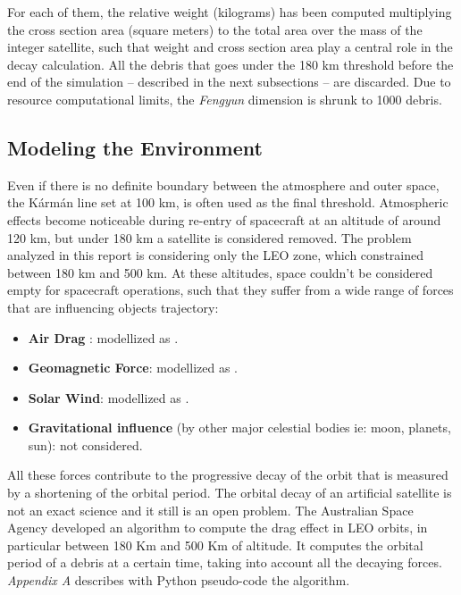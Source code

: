 \documentclass[a4paper,9pt,journal,twoside,compsoc]{PPIEEEtran}
\begin{document}
For each of them, the relative weight (kilograms) has been computed multiplying the cross section area (square meters) to the total area over the mass of the integer satellite, such that weight and cross section area play a central role in the decay calculation. All the debris that goes under the 180 km threshold before the end of the simulation -- described in the next subsections -- are discarded. Due to resource computational limits, the \textit{Fengyun} dimension is shrunk to 1000 debris. 

\subsection{Modeling the Environment}
Even if there is no definite boundary between the atmosphere and outer space, the Kármán line set at 100 km, is often used as the final threshold. Atmospheric effects become noticeable during re-entry of spacecraft at an altitude of around 120 km, but under 180 km a satellite is considered removed. The problem analyzed in this report is considering only the LEO zone, which constrained between 180 km and 500 km. At these altitudes, space couldn't be considered empty for spacecraft operations, such that they suffer from a wide range of forces that are influencing objects trajectory:

\begin{itemize}
\item \textbf{Air Drag} : modellized as \cite{australia}.
\item \textbf{Geomagnetic Force}: modellized as \cite{ap}.
\item \textbf{Solar Wind}: modellized as \cite{f10flux}.
\item \textbf{Gravitational influence} (by other major celestial bodies ie: moon, planets,     sun): not considered.
\end{itemize}

All these forces contribute to the progressive decay of the orbit that is measured by a shortening of the orbital period.
The orbital decay of an artificial satellite is not an exact science and it still is an open problem.
The Australian Space Agency developed an algorithm \cite{australia} to compute the drag effect in LEO orbits, in particular between 180 Km and 500 Km of altitude. It computes the orbital period of a debris at a certain time, taking into account all the decaying forces. \textit{Appendix A} describes with Python pseudo-code the algorithm.
\end{document}
